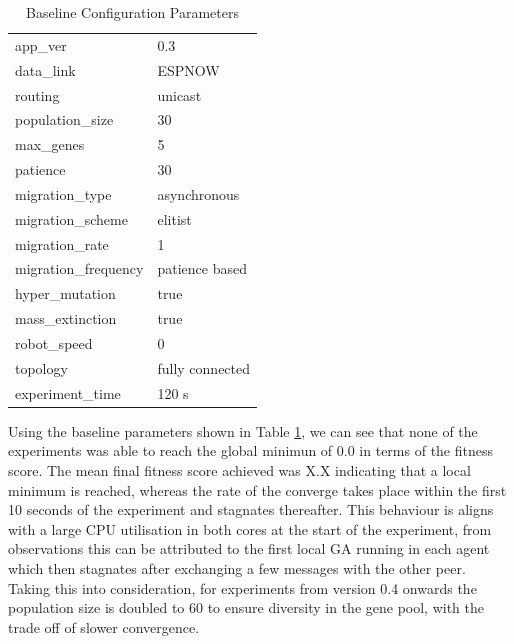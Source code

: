 \documentclass[conference]{IEEEtran}
\begin{document}
\begin{table}[h]
  \centering
  \caption{Baseline Configuration Parameters}
  \label{tab:base_config}
  \begin{tabular}{l@{~=~}l}
    app\_ver & 0.3\\
    data\_link & ESPNOW\\
    routing & unicast\\
    population\_size & 30\\
    max\_genes & 5\\
    patience & 30\\
    migration\_type & asynchronous\\
    migration\_scheme & elitist\\
    migration\_rate & 1\\
    migration\_frequency & patience based\\
    hyper\_mutation & true\\
    mass\_extinction & true\\
    robot\_speed & 0\\
    topology & fully connected\\
    experiment\_time & 120 s\\
  \end{tabular}
\end{table}

Using the baseline parameters shown in Table \ref{tab:base_config}, we can see that none of the experiments was able to reach the global minimun of 0.0 in terms of the fitness score. The mean final fitness score achieved was X.X indicating that a local minimum is reached, whereas the rate of the converge takes place within the first 10 seconds of the experiment and stagnates thereafter. This behaviour is aligns with a large CPU utilisation in both cores at the start of the experiment, from observations this can be attributed to the first local GA running in each agent which then stagnates after exchanging a few messages with the other peer. Taking this into consideration, for experiments from version 0.4 onwards the population size is doubled to 60 to ensure diversity in the gene pool, with the trade off of slower convergence.\\
\end{document}
